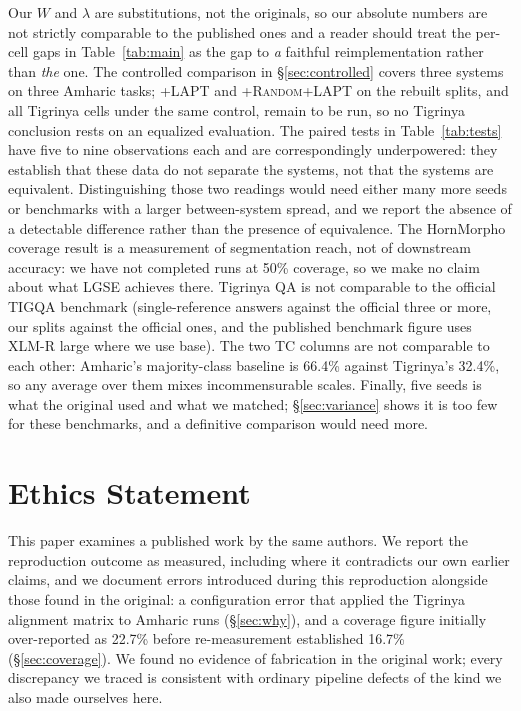 \documentclass[11pt]{article}
\begin{document}
Our $W$ and $\lambda$ are substitutions, not the originals, so our absolute
numbers are not strictly comparable to the published ones and a reader should
treat the per-cell gaps in Table~\ref{tab:main} as the gap to \textit{a}
faithful reimplementation rather than \textit{the} one. The controlled
comparison in \S\ref{sec:controlled} covers three systems on three Amharic
tasks; \textsc{+LAPT} and \textsc{+Random+LAPT} on the rebuilt splits, and
all Tigrinya cells under the same control, remain to be run, so no Tigrinya
conclusion rests on an equalized evaluation. The paired tests in
Table~\ref{tab:tests} have five to nine observations each and are
correspondingly underpowered: they establish that these data do not separate
the systems, not that the systems are equivalent. Distinguishing those two
readings would need either many more seeds or benchmarks with a larger
between-system spread, and we report the absence of a detectable difference
rather than the presence of equivalence. The HornMorpho coverage result is a measurement of
segmentation reach, not of downstream accuracy: we have not completed runs at
50\% coverage, so we make no claim about what LGSE achieves there. Tigrinya
QA is not comparable to the official TIGQA benchmark (single-reference
answers against the official three or more, our splits against the official
ones, and the published benchmark figure uses XLM-R large where we use base).
The two TC columns are not comparable to each other: Amharic's majority-class
baseline is 66.4\% against Tigrinya's 32.4\%, so any average over them mixes
incommensurable scales. Finally, five seeds is what the original used and what
we matched; \S\ref{sec:variance} shows it is too few for these benchmarks, and
a definitive comparison would need more.

\section*{Ethics Statement}

This paper examines a published work by the same authors. We report the
reproduction outcome as measured, including where it contradicts our own
earlier claims, and we document errors introduced during this reproduction
alongside those found in the original: a configuration error that applied the
Tigrinya alignment matrix to Amharic runs (\S\ref{sec:why}), and a coverage
figure initially over-reported as 22.7\% before re-measurement established
16.7\% (\S\ref{sec:coverage}). We found no evidence of fabrication in the
original work; every discrepancy we traced is consistent with ordinary
pipeline defects of the kind we also made ourselves here.
\end{document}
